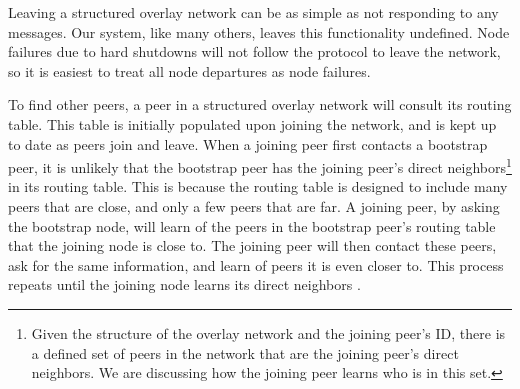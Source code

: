 \documentclass[12pt]{report}
\begin{document}

Leaving a structured overlay network can be as simple as not responding to any messages. Our system, like many others, leaves this functionality undefined. Node failures due to hard shutdowns will not follow the protocol to leave the network, so it is easiest to treat all node departures as node failures.

To find other peers, a peer in a structured overlay network will consult its routing table. This table is initially populated upon joining the network, and is kept up to date as peers join and leave. When a joining peer first contacts a bootstrap peer, it is unlikely that the bootstrap peer has the joining peer's direct neighbors\footnote{Given the structure of the overlay network and the joining peer's ID, there is a defined set of peers in the network that are the joining peer's direct neighbors. We are discussing how the joining peer learns who is in this set.} in its routing table. This is because the routing table is designed to include many peers that are close, and only a few peers that are far. A joining peer, by asking the bootstrap node, will learn of the peers in the bootstrap peer's routing table that the joining node is close to. The joining peer will then contact these peers, ask for the same information, and learn of peers it is even closer to. This process repeats until the joining node learns its direct neighbors \cite{p2pSurvey}.
\end{document}
